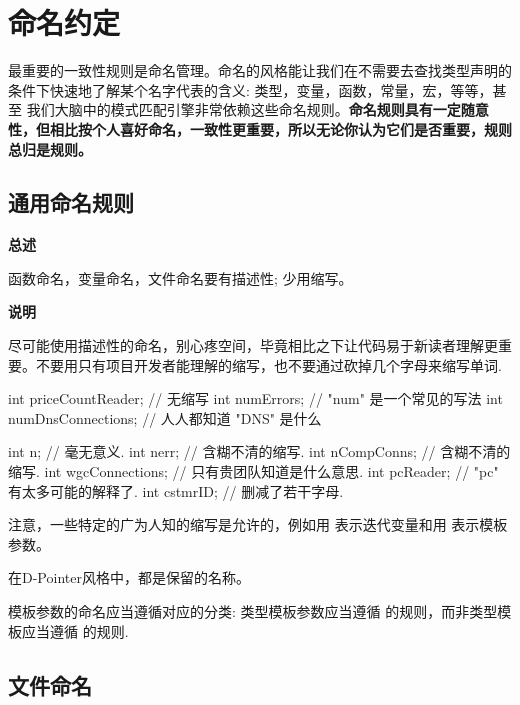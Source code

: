 \chapter{命名约定}

最重要的一致性规则是命名管理。命名的风格能让我们在不需要去查找类型声明的条件下快速地了解某个名字代表的含义: 类型，变量，函数，常量，宏，等等，甚至 我们大脑中的模式匹配引擎非常依赖这些命名规则。\textbf{命名规则具有一定随意性，但相比按个人喜好命名，一致性更重要，所以无论你认为它们是否重要，规则总归是规则。}

\section{通用命名规则} \label{general-naming-rules}

\textbf{总述}

函数命名，变量命名，文件命名要有描述性; 少用缩写。

\textbf{说明}

尽可能使用描述性的命名，别心疼空间，毕竟相比之下让代码易于新读者理解更重要。不要用只有项目开发者能理解的缩写，也不要通过砍掉几个字母来缩写单词.

\begin{cppcode}
  int priceCountReader;     // 无缩写
  int numErrors;            // "num" 是一个常见的写法
  int numDnsConnections;    // 人人都知道 "DNS" 是什么
\end{cppcode}

\begin{cppcode}
  int n;                     // 毫无意义.
  int nerr;                  // 含糊不清的缩写.
  int nCompConns;            // 含糊不清的缩写.
  int wgcConnections;        // 只有贵团队知道是什么意思.
  int pcReader;              // "pc" 有太多可能的解释了.
  int cstmrID;               // 删减了若干字母.
\end{cppcode}

注意，一些特定的广为人知的缩写是允许的，例如用  表示迭代变量和用  表示模板参数。

\begin{DWarn}
  在D-Pointer风格中，都是保留的名称。
\end{DWarn}

模板参数的命名应当遵循对应的分类: 类型模板参数应当遵循  的规则，而非类型模板应当遵循   的规则.

\section{文件命名}

